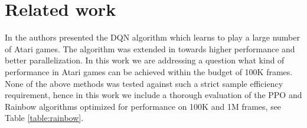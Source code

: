 \section{Related work}
\label{sec:related_work}

In \cite{dqn} the authors presented the DQN algorithm which learns to play a large number of Atari games. The algorithm was extended in \cite{ppo,acktr,dqn2,rainbow,a3c} towards higher performance and better parallelization. %
In this work we are addressing a question what kind of performance in Atari games can be achieved within the budget of 100K frames. None of the above methods was tested against such a strict sample efficiency requirement, hence in this work we include a thorough evaluation of the PPO \cite{ppo} and Rainbow \cite{rainbow} algorithms optimized for performance on 100K and 1M frames, see Table \ref{table:rainbow}.

